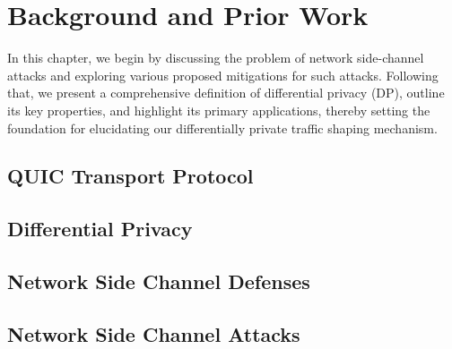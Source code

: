 \chapter{Background and Prior Work}
In this chapter, we begin by discussing the problem of network side-channel attacks and exploring various proposed mitigations for such attacks. 
Following that, we present a comprehensive definition of differential privacy (DP), outline its key properties, and highlight its primary applications, thereby setting the foundation for elucidating our differentially private traffic shaping mechanism. 

\section{QUIC Transport Protocol}


\section{Differential Privacy}\label{sec:dp-background}


\section{Network Side Channel Defenses}\label{sec:ns-defenses}


\section{Network Side Channel Attacks}\label{sec:ns-attacks}




